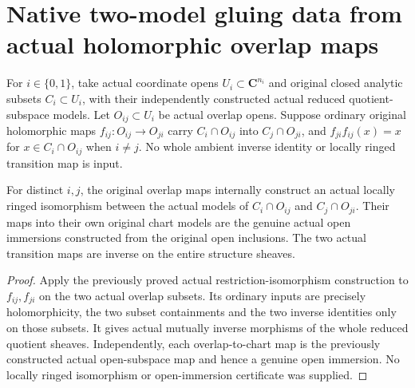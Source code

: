 \section{Native two-model gluing data from actual holomorphic overlap maps}
\label{sec:hironaka-actual-two-model-analytic-glue-data}

For $i\in\{0,1\}$, take actual coordinate opens $U_i\subset\mathbf C^{n_i}$
and original closed analytic subsets $C_i\subset U_i$, with their
independently constructed actual reduced quotient-subspace models. Let $O_{ij}\subset U_i$ be actual overlap
opens. Suppose ordinary original holomorphic maps
$f_{ij}:O_{ij}\to O_{ji}$ carry $C_i\cap O_{ij}$ into $C_j\cap O_{ji}$,
and $f_{ji}f_{ij}(x)=x$ for $x\in C_i\cap O_{ij}$ when $i\ne j$.
No whole ambient inverse identity or locally ringed transition map is input.

\begin{theorem}
\label{hir:actual-two-model-overlap-isomorphisms}
\leanok
For distinct $i,j$, the original overlap maps internally construct an actual
locally ringed isomorphism between the actual models of $C_i\cap O_{ij}$
and $C_j\cap O_{ji}$. Their maps into their own original chart models are
the genuine actual open immersions constructed from the original open
inclusions. The two actual transition maps are inverse on the entire
structure sheaves.
\end{theorem}
\begin{proof}
Apply the previously proved actual restriction-isomorphism construction
to $f_{ij},f_{ji}$ on the two actual overlap subsets. Its ordinary inputs
are precisely holomorphicity, the two subset containments and the two
inverse identities only on those subsets. It gives actual mutually
inverse morphisms of the whole reduced quotient sheaves. Independently,
each overlap-to-chart map is the previously constructed actual
open-subspace map and hence a genuine open immersion. No locally ringed
isomorphism or open-immersion certificate was supplied.
\end{proof}

